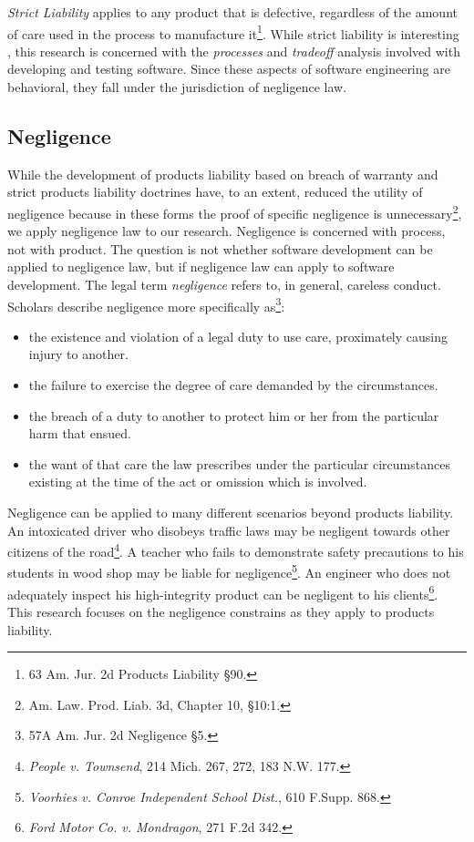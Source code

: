 \textit{Strict Liability} applies to any product that is defective, regardless
of the amount of care used in the process to manufacture it\footnote{63 Am. Jur.
2d Products Liability \S 90.}. While strict liability is interesting
\cite{Turner00}, this research is concerned with the \textit{processes} and
\textit{tradeoff} analysis involved with developing and testing software. Since
these aspects of software engineering are behavioral, they fall under the
jurisdiction of negligence law.

\subsection{Negligence}\label{SS:Negligence}
While the development of products liability based on breach of warranty and
strict products liability doctrines have, to an extent, reduced the utility of
negligence because in these forms the proof of specific negligence is
unnecessary\footnote{Am. Law. Prod. Liab. 3d, Chapter 10, \S 10:1.}, we apply
negligence law to our research. Negligence is concerned with process, not with
product. The question is not whether software development can be applied to
negligence law, but if negligence law can apply to software development. The
legal term \textit{negligence} refers to, in general, careless conduct. 
Scholars describe negligence more specifically as\footnote{57A Am. Jur. 2d
Negligence \S 5.}:\singlespace
\begin{itemize}
 \item the existence and violation of a legal duty to use care, proximately 
 causing injury to another.
 \item the failure to exercise the degree of care demanded by the circumstances.
 \item the breach of a duty to another to protect him or her from the particular
 harm that ensued.
 \item the want of that care the law prescribes under the particular
 circumstances existing at the time of the act or omission which is involved.
\end{itemize}\doublespace

Negligence can be applied to many different scenarios beyond products
liability. An intoxicated driver who disobeys traffic laws may be negligent
towards other citizens of the road\footnote{\textit{People v. Townsend}, 214
Mich. 267, 272, 183 N.W. 177.}. A teacher who fails to demonstrate safety
precautions to his students in wood shop may be liable for
negligence\footnote{\textit{Voorhies v. Conroe Independent School Dist.}, 610
F.Supp. 868.}. An engineer who does not adequately inspect his high-integrity
product can be negligent to his clients\footnote{\textit{Ford Motor Co. v.
Mondragon}, 271 F.2d 342.}. This research focuses on the negligence constrains
as they apply to products liability.

